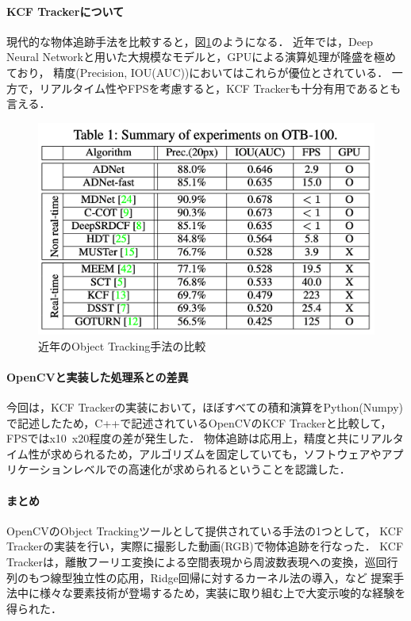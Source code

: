 \documentclass[11pt,a4j]{jarticle}
\begin{document}
  \paragraph{KCF Trackerについて}
  現代的な物体追跡手法を比較すると，図\ref{fig:tracker_comparison}のようになる．\cite{yun2017adnet}
  近年では，Deep Neural Networkと用いた大規模なモデルと，GPUによる演算処理が隆盛を極めており，
  精度(Precision, IOU(AUC))においてはこれらが優位とされている．
  一方で，リアルタイム性やFPSを考慮すると，KCF Trackerも十分有用であるとも言える．

  \begin{figure}[htbp]
    \begin{center}
      \includegraphics[clip,width=12.5cm]{./figures/yun2017adnet.png}
      \caption{近年のObject Tracking手法の比較\cite{yun2017adnet}}
      \label{fig:tracker_comparison}
    \end{center}
  \end{figure}

  \paragraph{OpenCVと実装した処理系との差異}
  今回は，KCF Trackerの実装において，ほぼすべての積和演算をPython(Numpy)で記述したため，C++で記述されているOpenCVのKCF Trackerと比較して，FPSではx10~x20程度の差が発生した．
  物体追跡は応用上，精度と共にリアルタイム性が求められるため，アルゴリズムを固定していても，ソフトウェアやアプリケーションレベルでの高速化が求められるということを認識した．

  \paragraph{まとめ}
  OpenCVのObject Trackingツールとして提供されている手法の1つとして，
  KCF Tracker\cite{DBLP:journals/corr/HenriquesCMB14}の実装を行い，実際に撮影した動画(RGB)で物体追跡を行なった．
  KCF Trackerは，離散フーリエ変換による空間表現から周波数表現への変換，巡回行列のもつ線型独立性の応用，Ridge回帰に対するカーネル法の導入，など
  提案手法中に様々な要素技術が登場するため，実装に取り組む上で大変示唆的な経験を得られた．

  \newpage

\end{document}
